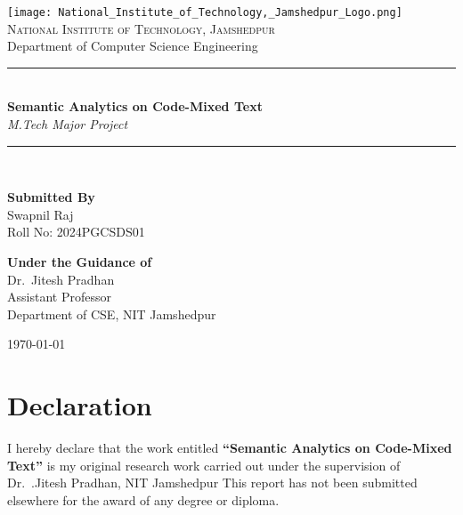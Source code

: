 \documentclass[12pt,a4paper]{article}
\begin{document}
\begin{titlepage}
  \thispagestyle{empty}

  \begin{center}
    \texttt{[image: National\_Institute\_of\_Technology,\_Jamshedpur\_Logo.png]}\\[0.8cm]

    {\Large \textsc{National Institute of Technology, Jamshedpur}}\\[0.4cm]
    {\large Department of Computer Science Engineering}\\[1.0cm]

    \rule{\textwidth}{0.6pt}\\[0.9cm]

    {\LARGE \bfseries Semantic Analytics on Code-Mixed Text}\\[0.25cm]
    {\large \itshape M.Tech Major Project}\\[0.6cm]

    \rule{0.6\textwidth}{0.6pt}\\[1.2cm]
  \end{center}

  \vspace{0.3cm}
  \noindent
  \begin{minipage}[t]{0.48\textwidth}
    \textbf{Submitted By}\\
    Swapnil Raj\\
    Roll No: 2024PGCSDS01
  \end{minipage}
  \hfill
  \begin{minipage}[t]{0.48\textwidth}
    \raggedleft
    \textbf{Under the Guidance of}\\
    Dr.~Jitesh Pradhan\\
    Assistant Professor\\
    Department of CSE,
    NIT Jamshedpur
  \end{minipage}

  \vfill
  \begin{center}
    {\large \today}
  \end{center}
\end{titlepage}






\tableofcontents
\clearpage

\section*{Declaration}
I hereby declare that the work entitled \textbf{``Semantic Analytics on Code-Mixed Text''} is my original research work carried out under the supervision of Dr.~.Jitesh Pradhan, NIT Jamshedpur This report has not been submitted elsewhere for the award of any degree or diploma.
\end{document}
